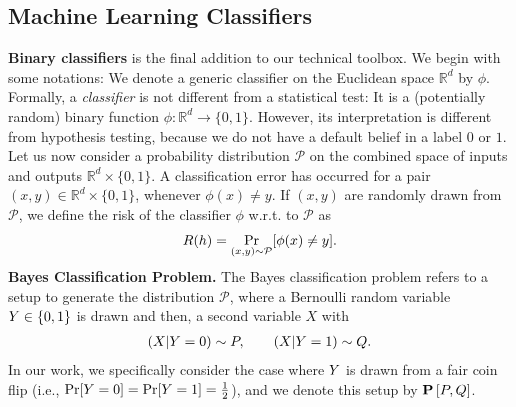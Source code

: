


\subsection{Machine Learning Classifiers} \label{sec:class}
\textbf{Binary classifiers} is the final addition to our technical toolbox. We begin with some notations: We denote a generic classifier on the Euclidean space $\mathbb{R}^d$ by $\phi$. Formally, a {\em classifier} is not different from a statistical test: It is a (potentially random) binary function $\phi: \mathbb{R}^d \to \{0,1\}$. However, its interpretation is different from hypothesis testing, because we do not have a default belief in a label $0$ or $1$. 
Let us now consider a probability distribution $\mathcal{P}$ on the combined space of inputs and outputs $\mathbb{R}^d \times \{0,1\}$. A classification error has occurred for a pair $(x,y) \in \mathbb{R}^d \times \{0,1\}$, whenever $\phi(x) \neq y$. If $(x,y)$ are randomly drawn from $\mathcal{P}$, we define the risk of the classifier $\phi$ w.r.t. to $\mathcal{P}$ as
    \begin{align*}
        R(h) = \Pr\limits_{(x,y)\sim \mathcal{P}}[\phi(x) \neq y].
    \end{align*}
\smallskip
\noindent \textbf{Bayes Classification Problem.} The Bayes classification problem refers to a setup to generate the distribution $\mathcal{P}$, where a Bernoulli random variable $Y \in \{0,1\}$ is drawn and then, a second variable $X$ with
\begin{align*}
    (X|Y=0) \sim P, \qquad (X|Y=1) \sim Q.
\end{align*}
In our work, we specifically consider the case where $Y$ is drawn from a fair coin flip (i.e., $\Pr[Y=0] = \Pr[Y=1] = \frac{1}{2}$), and we denote this setup by $\mathbf{P}\left[P, Q\right]$.

